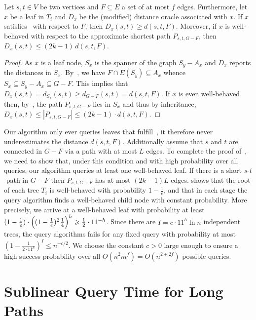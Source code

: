 \documentclass{theoretics}
\newcommand*{\nwspace}{\hspace*{.1em}}
\renewcommand{\le}{\leqslant}
\renewcommand{\ge}{\geqslant}
\begin{document}
\begin{lemma}
\label{lem:approx_well-behaved_child}
  Let $s,t \in V$ be two vertices and $F \subseteq E$ a set of at most $f$ edges.
  Furthermore, let $x$ be a leaf in $T_i$ and $D_x$ be the (modified) distance oracle associated with $x$.
  If $x$ satisfies~ with respect to $F$, then $D_x(s,t) \ge d(s,t,F)$.
  Moreover, if $x$ is well-behaved with respect to the approximate shortest path $P_{s,t,G-F}$,
  then $D_x(s,t) \le (2k{-}1) \, d(s,t,F)$.
\end{lemma}

\begin{proof}
As $x$ is a leaf node, $S_x$ is the spanner of the graph $S_y-A_x$
and $D_x$ reports the distances in $S_x$.
By~, we have $F\cap E(S_y)\subseteq A_x$ 
whence $S_x \subseteq S_y-A_x \subseteq G-F$.
This implies that~$D_x(s,t) = d_{S_x}(s,t) \ge d_{G-F}(s,t) = d(s,t,F)$.
If $x$ is even well-behaved then, by~, the path $P_{s,t,G-F}$ lies in $S_x$
and thus by inheritance, $D_x(s,t) \le |P_{s,t,G-F}| \le (2k{-}1) \cdot d(s,t,F)$.
\end{proof}

Our algorithm only ever queries leaves that fulfill~,
it therefore never underestimates the distance $d(s,t,F)$.
Additionally assume that $s$ and $t$ are connected in $G{-}F$ via a path with at most $L$ edges.
To complete the proof of~,
we need to show that, under this condition and with high probability over all queries,
our algorithm queries at least one well-behaved leaf.
If there is a short $s$-$t$-path in $G{-}F$ then $P_{s,t,G-F}$ has at most $(2k{-}1)L$ edges.
 shows that the root of each tree $T_i$
is well-behaved with probability $1-\frac{1}{e}$, 
and that in each stage the query algorithm finds a well-behaved child node with constant probability.
More precisely, we arrive at a well-behaved leaf with probability at least
$(1-\tfrac{1}{e}) \cdot \Big( (1-\tfrac{1}{e})^2 \nwspace \tfrac{1}{4} \Big)^h
  \ge \tfrac{1}{2} \cdot 11^{-h}$.
Since there are $I = c \cdot 11^h \ln n$ independent trees,
the query algorithms fails for any fixed query with probability at most 
$(1-\frac{1}{2 \cdot 11^h})^I \le n^{-c/2}$.
We choose the constant $c > 0$ large enough to ensure a high success probability over all 
$O(n^2 m^f) = O(n^{2+2f})$ possible queries.


\section{Sublinear Query Time for Long Paths}
\label{sec:sublinear_query_time}
\end{document}
